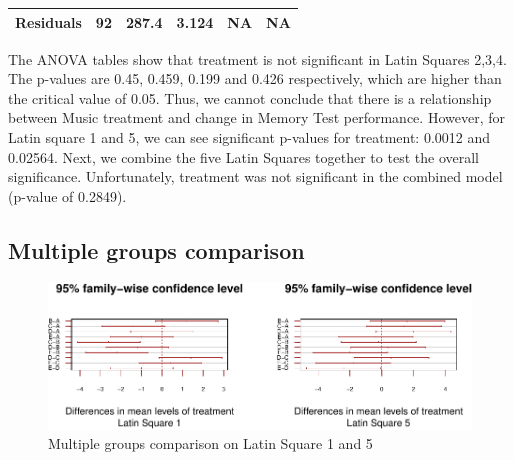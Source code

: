\documentclass[]{article}
\begin{document}
\begin{longtable}[]{@{}cccccc@{}}
\begin{minipage}[t]{0.19\columnwidth}
\textbf{Residuals}\strut
\end{minipage} & \begin{minipage}[t]{0.06\columnwidth}\centering\strut
92\strut
\end{minipage} & \begin{minipage}[t]{0.10\columnwidth}\centering\strut
287.4\strut
\end{minipage} & \begin{minipage}[t]{0.12\columnwidth}\centering\strut
3.124\strut
\end{minipage} & \begin{minipage}[t]{0.12\columnwidth}\centering\strut
NA\strut
\end{minipage} & \begin{minipage}[t]{0.12\columnwidth}\centering\strut
NA\strut
\end{minipage}\tabularnewline
\bottomrule
\end{longtable}

The ANOVA tables show that treatment is not significant in Latin Squares
2,3,4. The p-values are 0.45, 0.459, 0.199 and 0.426 respectively, which
are higher than the critical value of 0.05. Thus, we cannot conclude
that there is a relationship between Music treatment and change in
Memory Test performance. However, for Latin square 1 and 5, we can see
significant p-values for treatment: 0.0012 and 0.02564. Next, we combine
the five Latin Squares together to test the overall significance.
Unfortunately, treatment was not significant in the combined model
(p-value of 0.2849).

\subsection{Multiple groups
comparison}\label{multiple-groups-comparison}

\begin{figure}
\centering
\includegraphics{STATS101B-Project-Code_files/figure-latex/unnamed-chunk-7-1.pdf}
\caption{Multiple groups comparison on Latin Square 1 and 5}
\end{figure}
\end{document}
